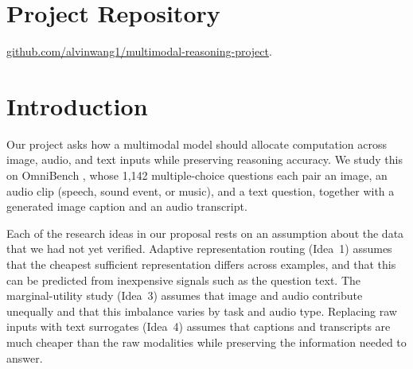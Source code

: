 \documentclass{article}
\begin{document}

\printAffiliationsAndNotice{}

\section{Project Repository}

\href{https://github.com/alvinwang1/multimodal-reasoning-project/}
{github.com/alvinwang1/multimodal-reasoning-project}.

\section{Introduction}

Our project asks how a multimodal model should allocate computation across
image, audio, and text inputs while preserving reasoning accuracy. We study
this on OmniBench \citep{li2025omnibench}, whose 1,142 multiple-choice
questions each pair an image, an audio clip (speech, sound event, or music),
and a text question, together with a generated image caption and an audio
transcript.

Each of the research ideas in our proposal rests on an assumption about the
data that we had not yet verified. Adaptive representation routing (Idea~1)
assumes that the cheapest sufficient representation differs across examples,
and that this can be predicted from inexpensive signals such as the question
text. The marginal-utility study (Idea~3) assumes that image and audio
contribute unequally and that this imbalance varies by task and audio type.
Replacing raw inputs with text surrogates (Idea~4) assumes that captions and
transcripts are much cheaper than the raw modalities while preserving the
information needed to answer.
\end{document}
